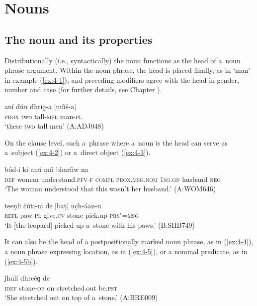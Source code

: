 \chapter{Nouns}
\label{chap:4}

\section{The noun and its properties}
\label{sec:4-1}


Distributionally (i.e., syntactically) the noun functions as the head of a~noun phrase argument. Within the noun phrase, the head is placed finally, as in `man' in example (\ref{ex:4-1}), and preceding modifiers agree with the head in gender, number and case (for further details, see Chapter ).


\begin{exe}
\ex
\label{ex:4-1}
\gll aní dúu dhríɡ-a [míiš-a] \\
	\textsc{prox} two tall-\textsc{mpl} man-\textsc{pl} \\
\glt `these two tall men' (A:ADJ048)
\end{exe}

On the clause level, such a~phrase where a~noun is the head can serve as a~subject (\ref{ex:4-2}) or a~direct object (\ref{ex:4-3}).

\begin{exe}
\ex
\label{ex:4-2}
\gll [se kúṛi] búd-i ki anú míi bharíiw na \\
	\textsc{def} woman understand.\textsc{pfv-f} \textsc{compl} \textsc{prox.msg.nom} \textsc{1sg.gn} husband \textsc{neg} \\
\glt `The woman understood that this wasn't her husband.' (A:WOM646)
\end{exe}

\begin{exe}
\ex
\label{ex:4-3}
\gll teeṇíi čúti-m de [baṭ] uc̣h-áan-u \\
	\textsc{refl} paw-\textsc{pl} give.\textsc{cv} stone pick.up-\textsc{prs"=msg} \\
\glt `It [the leopard] picked up a~stone with his paws.' (B:SHB749)
\end{exe}

It can also be the head of a postpositionally marked noun phrase, as in (\ref{ex:4-4}), a noun phrase expressing location, as in (\ref{ex:4-5}), or a nominal predicate, as in (\ref{ex:4-5b}).

\begin{exe}
\ex
\label{ex:4-4}
\gll [áa baṭ-á] ǰhulí dhreéɡ de \\ 
\textsc{idef} stone-\textsc{ob} on stretched.out be.\textsc{pst} \\
\glt `She stretched out on top of a~stone.' (A:BRE009)
\end{exe}

